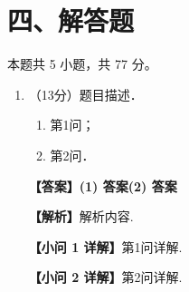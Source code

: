 \documentclass[12pt,a4paper]{ctexart}
\newcommand{\daan}[1]{{\color{red}\textbf{【答案】#1}}}
\newcommand{\jieti}{\par{\color{gray!60!black}\textbf{【解析】}}}
\newcommand{\xiaoI}{\par{\color{blue!60!black}\textbf{【小问 1 详解】}}}
\newcommand{\xiaoII}{\par{\color{blue!60!black}\textbf{【小问 2 详解】}}}
\begin{document}
\section*{四、解答题}
本题共 5 小题，共 77 分。

\begin{enumerate}[resume]
    \item （13分）题目描述．
    \begin{enumerate}
        \item 第1问；
        \item 第2问．
    \end{enumerate}
    \daan{(1) 答案\quad (2) 答案}
    \jieti 解析内容.
    \xiaoI 第1问详解.
    \xiaoII 第2问详解.
\end{enumerate}
\end{document}
